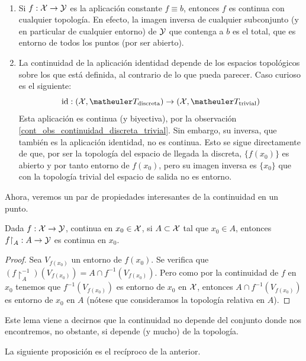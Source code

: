 \begin{obs} \
	\label{cont_obs_continuidad_cte_e_id}
	\begin{enumerate}
		\item Si $f:\mathcal{X}\to\mathcal{Y}$ es la aplicación constante $f\equiv b$, entonces $f$ es continua con cualquier topología. En efecto, la imagen inversa de cualquier subconjunto (y en particular de cualquier entorno) de $\mathcal{Y}$ que contenga a $b$ es el total, que es entorno de todos los puntos (por ser abierto).
		
		\item La continuidad de la aplicación identidad depende de los espacios topológicos sobre los que está definida, al contrario de lo que pueda parecer. Caso curioso es el siguiente:
		\[\text{id}:(\X,\T_\text{discreta})\to (\X,\T_\text{trivial})\]
		Esta aplicación es continua (y biyectiva), por la observación \ref{cont_obs_continuidad_discreta_trivial}. Sin embargo, su inversa, que también es la aplicación identidad, no es continua. Esto se sigue directamente de que, por ser la topología del espacio de llegada la discreta, $\{f(x_0)\}$ es abierto y por tanto entorno de $f(x_0)$, pero su imagen inversa es $\{x_0\}$ que con la topología trivial del espacio de salida no es entorno. \qedhere
	\end{enumerate}
\end{obs}

Ahora, veremos un par de propiedades interesantes de la continuidad en un punto.

\begin{prop}
	Dada $f:\mathcal{X}\to\mathcal{Y}$, continua en $x_0\in\mathcal{X}$, si $A\subset\mathcal{X}$ tal que $x_0\in A$, entonces $f\mathord{\upharpoonright}_A:A\to\mathcal{Y}$ es continua en $x_0$.
	
	\begin{proof}
		Sea $V_{f(x_0)}$ un entorno de $f(x_0)$. Se verifica que $(f\restriction_A^{-1})(V_{f(x_0)}) = A\cap f^{-1}(V_{f(x_0)})$. Pero como por la continuidad de $f$ en $x_0$ tenemos que $f^{-1}(V_{f(x_0)})$ es entorno de $x_0$ en $\mathcal{X}$, entonces $A\cap f^{-1}(V_{f(x_0)})$ es entorno de $x_0$ en $A$ (nótese que consideramos la topología relativa en $A$).
	\end{proof}
\end{prop}

	Este lema viene a decirnos que la continuidad no depende del conjunto donde nos encontremos, no obstante, si depende (y mucho) de la topología.
	
	La siguiente proposición es el recíproco de la anterior.

